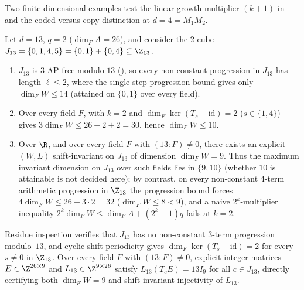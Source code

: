 Two finite-dimensional examples test the linear-growth multiplier $(k+1)$ in 
and the coded-versus-copy distinction at $d = 4 = M_1 M_2$.

\begin{example}[$3$-AP-free $2$-cube witness at $d = 13$ ($9 \le \max\dim_F W \le 10$)]\label{ex:d13-witness}
Let $d = 13$, $q = 2$ ($\dim_F A = 26$), and consider the $2$-cube
$J_{13} = \{0, 1, 4, 5\} = \{0,1\} + \{0,4\} \subseteq \Z_{13}$.
\begin{enumerate}[label=(\alph*)]
\item $J_{13}$ is $3$-AP-free modulo $13$ (), so every non-constant progression
  in $J_{13}$ has length $\ell \le 2$, where the single-step progression bound gives only
  $\dim_F W \le 14$ (attained on $\{0,1\}$ over every field).
\item Over every field $F$,  with $k = 2$ and
  $\dim_F\ker(T_s - \mathrm{id}) = 2$ ($s \in \{1,4\}$) gives $3\dim_F W \le 26 + 2 + 2 = 30$, hence
  $\dim_F W \le 10$.
\item Over $\R$, and over every field $F$ with $(13 : F) \ne 0$, there exists an explicit $(W, L)$
  shift-invariant on $J_{13}$ of dimension $\dim_F W = 9$. Thus the maximum invariant dimension on
  $J_{13}$ over such fields lies in $\{9, 10\}$ (whether $10$ is attainable is not decided here); by
  contrast, on every non-constant $4$-term arithmetic progression in $\Z_{13}$ the progression bound
  forces $4\dim_F W \le 26 + 3 \cdot 2 = 32$ ($\dim_F W \le 8 < 9$), and a naive $2^k$-multiplier
  inequality $2^k \dim_F W \le \dim_F A + (2^k - 1)q$ fails at $k = 2$.
\end{enumerate}
\end{example}
\begin{outline}
Residue inspection verifies that $J_{13}$ has no non-constant $3$-term progression modulo~$13$, and
cyclic shift periodicity gives $\dim_F\ker(T_s - \mathrm{id}) = 2$ for every $s \ne 0$ in $\Z_{13}$.
Over every field $F$ with $(13 : F) \ne 0$, explicit integer matrices $E \in \Z^{26\times 9}$ and
$L_{13} \in \Z^{9\times 26}$ satisfy $L_{13}(T_c E) = 13 I_9$ for all $c \in J_{13}$, directly
certifying both $\dim_F W = 9$ and shift-invariant injectivity of $L_{13}$.
\end{outline}

